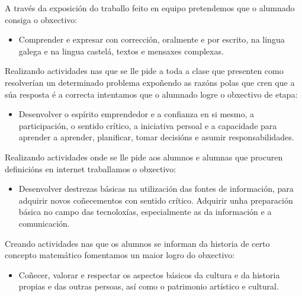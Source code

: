 A través da exposición do traballo feito en equipo pretendemos que o alumnado consiga o obxectivo:

\begin{itemize}
    \item Comprender e expresar con corrección, oralmente e por escrito, na lingua galega e na lingua castelá, textos e mensaxes complexas.
\end{itemize}

Realizando actividades nas que se lle pide a toda a clase que presenten como resolverían un determinado problema expoñendo as razóns polas que cren que a súa resposta é a correcta intentamos que o alumnado logre o obxectivo de etapa:
\begin{itemize}
    \item Desenvolver o espírito emprendedor e a confianza en si mesmo, a participación, o sentido crítico, a iniciativa persoal e a capacidade para aprender a aprender, planificar, tomar decisións e asumir responsabilidades.
\end{itemize}

Realizando actividades onde se lle pide aos alumnos e alumnas que procuren definicións en internet traballamos o obxectivo:
\begin{itemize}
    \item Desenvolver destrezas básicas na utilización das fontes de información, para adquirir novos coñecementos con sentido crítico. Adquirir unha preparación básica no campo das tecnoloxías, especialmente as da información e a comunicación.
\end{itemize}

Creando actividades nas que os alumnos se informan da historia de certo concepto matemático fomentamos un maior logro do obxectivo:

\begin{itemize}
    \item Coñecer, valorar e respectar os aspectos básicos da cultura e da historia propias e das outras persoas, así como o patrimonio artístico e cultural.
\end{itemize}
